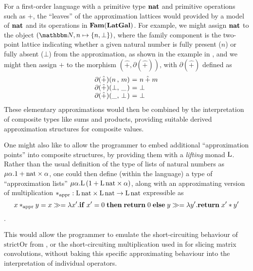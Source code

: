 For a first-order language with a primitive type $\mathbf{nat}$ and primitive operations such as $+$, the
``leaves'' of the approximation lattices would provided by a model of $\mathbf{nat}$ and its operations in
$\mathbf{Fam}(\mathbf{LatGal})$. For example, we might assign $\mathbf{nat}$ to the object $(\Nat,n \mapsto \{n, \bot\})$, where
the family component is the two-point lattice indicating whether a given natural number is fully present ($n$)
or fully absent ($\bot$) from the approximation, as shown in the example in , and we
might then assign $+$ to the morphism $(\hat+,\partial(\hat+))$, with $\partial(\hat+)$ defined as
\begin{displaymath}
    \begin{array}[t]{l@{(}l@{,~}l@{)~}c@{~}l}
      \partial(\hat+)&n&m&=&n \mathbin{\hat+} m \\
      \partial(\hat+)&\bot&\_&=&\bot \\
      \partial(\hat+)&\_&\bot&=&\bot
    \end{array}
\end{displaymath}
These elementary approximations would then be combined by the interpretation of composite types like sums and
products, providing suitable derived approximation structures for composite values.

One might also like to allow the programmer to embed additional ``approximation points'' into composite
structures, by providing them with a \emph{lifting} monad $\mathrm{L}$. Rather than the usual definition of
the type of lists of natural numbers as $\mu\alpha.1 + \mathrm{nat} \times \alpha$, one could then define
(within the language) a type of ``approximation lists'' $\mu\alpha.\mathrm{L}\,(1 + \mathrm{L}\,\mathrm{nat}
\times \alpha)$, along with an approximating version of multiplication $*_{\text{appr}}:
\mathrm{L}\,\mathrm{nat} \times \mathrm{L}\,\mathrm{nat} \to \mathrm{L}\,\mathrm{nat}$ expressible as
\[x *_{\text{appr}} y = {x}\gg={\lambda x'.\mathbf{if}\;x' =
0\;\mathbf{then}\;\mathbf{return}\;0\;\mathbf{else}\;{y}\gg={\lambda y'.\mathbf{return}\;x' * y'}}\].

\noindent This would allow the programmer to emulate the short-circuiting behaviour of $\mathrm{strictOr}$
from , or the short-circuiting multiplication used in \citet{perera22} for slicing
matrix convolutions, without baking this specific approximating behaviour into the interpretation of
individual operators.


